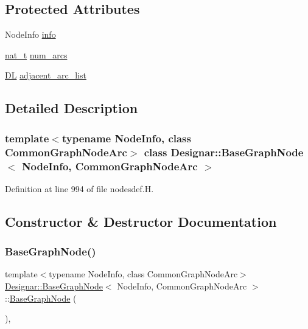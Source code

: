\subsection*{Protected Attributes}
\begin{DoxyCompactItemize}
\item 
Node\+Info \hyperlink{class_designar_1_1_base_graph_node_a78196723c561b3554cf8760ab2d902a8}{info}
\item 
\hyperlink{namespace_designar_aa72662848b9f4815e7bf31a7cf3e33d1}{nat\+\_\+t} \hyperlink{class_designar_1_1_base_graph_node_a035347b8e1ffaca5df73b42bef300e0f}{num\+\_\+arcs}
\item 
\hyperlink{class_designar_1_1_d_l}{DL} \hyperlink{class_designar_1_1_base_graph_node_a160dab27497d195ecdf93272a40a2cb5}{adjacent\+\_\+arc\+\_\+list}
\end{DoxyCompactItemize}


\subsection{Detailed Description}
\subsubsection*{template$<$typename Node\+Info, class Common\+Graph\+Node\+Arc$>$\newline
class Designar\+::\+Base\+Graph\+Node$<$ Node\+Info, Common\+Graph\+Node\+Arc $>$}



Definition at line 994 of file nodesdef.\+H.



\subsection{Constructor \& Destructor Documentation}
\mbox{\label{class_designar_1_1_base_graph_node_a6eb12fac0ce731cb881c31b095493ef5}} 
\subsubsection{\texorpdfstring{Base\+Graph\+Node()}{BaseGraphNode()}\hspace{0.1cm}{\footnotesize\ttfamily [1/4]}}
{\footnotesize\ttfamily template$<$typename Node\+Info, class Common\+Graph\+Node\+Arc$>$ \\
\hyperlink{class_designar_1_1_base_graph_node}{Designar\+::\+Base\+Graph\+Node}$<$ Node\+Info, Common\+Graph\+Node\+Arc $>$\+::\hyperlink{class_designar_1_1_base_graph_node}{Base\+Graph\+Node} (\begin{DoxyParamCaption}{ }\end{DoxyParamCaption})\hspace{0.3cm}{\ttfamily [inline]}, {\ttfamily [protected]}}



